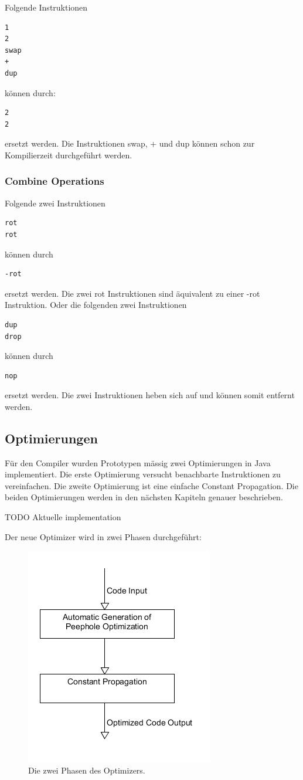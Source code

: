 Folgende Instruktionen
%
\begin{verbatim}
1
2
swap
+
dup
\end{verbatim}
%
können durch:
%
\begin{verbatim}
2
2
\end{verbatim}
%
ersetzt werden. Die Instruktionen swap, + und dup können schon zur Kompilierzeit durchgeführt werden.
\subsubsection{Combine Operations}
Folgende zwei Instruktionen
%
\begin{verbatim}
rot
rot
\end{verbatim}
%
können durch
%
\begin{verbatim}
-rot
\end{verbatim}
%
ersetzt werden. Die zwei rot Instruktionen sind äquivalent zu einer -rot Instruktion. Oder die folgenden zwei Instruktionen
%
\begin{verbatim}
dup
drop
\end{verbatim}
%
können durch
%
\begin{verbatim}
nop
\end{verbatim}
%
ersetzt werden. Die zwei Instruktionen heben sich auf und können somit entfernt werden.

\newpage

\subsection{Optimierungen}

Für den Compiler wurden Prototypen mässig zwei Optimierungen in Java implementiert. Die erste Optimierung versucht benachbarte Instruktionen zu vereinfachen. Die zweite Optimierung ist eine einfache Constant Propagation. Die beiden Optimierungen werden in den nächsten Kapiteln genauer beschrieben. 

TODO Aktuelle implementation

Der neue Optimizer wird in zwei Phasen durchgeführt:

\begin{figure}[H]
	\centering
		\includegraphics[scale=0.6]{optimizer/optimizer.png}
		\caption{Die zwei Phasen des Optimizers.}
		\label{fig:extensionpoint}
\end{figure}


